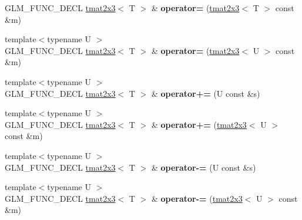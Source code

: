 \begin{DoxyCompactItemize}
\item 
\hypertarget{structglm_1_1detail_1_1tmat2x3_a0d57237fc072d33d7894af60e62a65d4}{\-G\-L\-M\-\_\-\-F\-U\-N\-C\-\_\-\-D\-E\-C\-L \hyperlink{structglm_1_1detail_1_1tmat2x3}{tmat2x3}$<$ \-T $>$ \& {\bfseries operator=} (\hyperlink{structglm_1_1detail_1_1tmat2x3}{tmat2x3}$<$ \-T $>$ const \&m)}\label{structglm_1_1detail_1_1tmat2x3_a0d57237fc072d33d7894af60e62a65d4}

\item 
\hypertarget{structglm_1_1detail_1_1tmat2x3_a19083f4c92591e8f61813912a16f142b}{{\footnotesize template$<$typename U $>$ }\\\-G\-L\-M\-\_\-\-F\-U\-N\-C\-\_\-\-D\-E\-C\-L \hyperlink{structglm_1_1detail_1_1tmat2x3}{tmat2x3}$<$ \-T $>$ \& {\bfseries operator=} (\hyperlink{structglm_1_1detail_1_1tmat2x3}{tmat2x3}$<$ \-U $>$ const \&m)}\label{structglm_1_1detail_1_1tmat2x3_a19083f4c92591e8f61813912a16f142b}

\item 
\hypertarget{structglm_1_1detail_1_1tmat2x3_a40cd213da5ad9df9f7d06b6cb8dad3ff}{{\footnotesize template$<$typename U $>$ }\\\-G\-L\-M\-\_\-\-F\-U\-N\-C\-\_\-\-D\-E\-C\-L \hyperlink{structglm_1_1detail_1_1tmat2x3}{tmat2x3}$<$ \-T $>$ \& {\bfseries operator+=} (\-U const \&s)}\label{structglm_1_1detail_1_1tmat2x3_a40cd213da5ad9df9f7d06b6cb8dad3ff}

\item 
\hypertarget{structglm_1_1detail_1_1tmat2x3_a0b945cc0c1582dd03349bad81359e2db}{{\footnotesize template$<$typename U $>$ }\\\-G\-L\-M\-\_\-\-F\-U\-N\-C\-\_\-\-D\-E\-C\-L \hyperlink{structglm_1_1detail_1_1tmat2x3}{tmat2x3}$<$ \-T $>$ \& {\bfseries operator+=} (\hyperlink{structglm_1_1detail_1_1tmat2x3}{tmat2x3}$<$ \-U $>$ const \&m)}\label{structglm_1_1detail_1_1tmat2x3_a0b945cc0c1582dd03349bad81359e2db}

\item 
\hypertarget{structglm_1_1detail_1_1tmat2x3_a048672316f8a61a421e388ea1c16f9a4}{{\footnotesize template$<$typename U $>$ }\\\-G\-L\-M\-\_\-\-F\-U\-N\-C\-\_\-\-D\-E\-C\-L \hyperlink{structglm_1_1detail_1_1tmat2x3}{tmat2x3}$<$ \-T $>$ \& {\bfseries operator-\/=} (\-U const \&s)}\label{structglm_1_1detail_1_1tmat2x3_a048672316f8a61a421e388ea1c16f9a4}

\item 
\hypertarget{structglm_1_1detail_1_1tmat2x3_a6bdb2900bca1960b6a7c748c54492661}{{\footnotesize template$<$typename U $>$ }\\\-G\-L\-M\-\_\-\-F\-U\-N\-C\-\_\-\-D\-E\-C\-L \hyperlink{structglm_1_1detail_1_1tmat2x3}{tmat2x3}$<$ \-T $>$ \& {\bfseries operator-\/=} (\hyperlink{structglm_1_1detail_1_1tmat2x3}{tmat2x3}$<$ \-U $>$ const \&m)}\label{structglm_1_1detail_1_1tmat2x3_a6bdb2900bca1960b6a7c748c54492661}


\end{DoxyCompactItemize}
